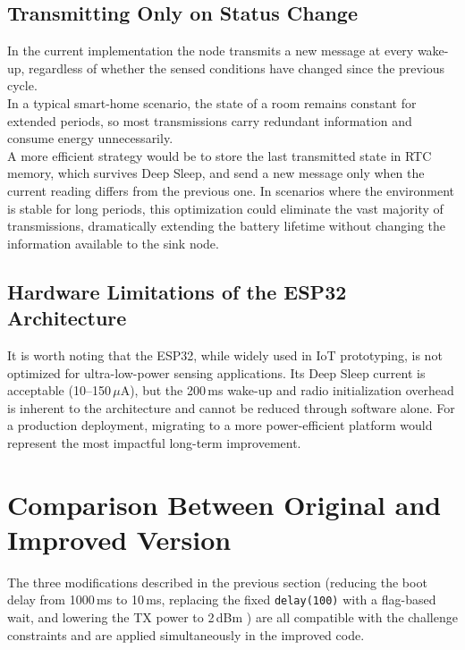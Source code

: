 \documentclass[a4paper,11pt]{article}
\begin{document}
\subsection{Transmitting Only on Status Change}

In the current implementation the node transmits a new message at every wake-up, regardless of whether the sensed conditions have changed since the previous cycle.\\

In a typical smart-home scenario, the state of a room remains constant for extended periods, so most transmissions carry redundant information and consume energy unnecessarily.\\

A more efficient strategy would be to store the last transmitted state in RTC memory, which survives Deep Sleep, and send a new message only when the current reading differs from the previous one. In scenarios where the environment is stable for long periods, this optimization could eliminate the vast majority of transmissions, dramatically extending the battery lifetime without changing the information available to the sink node.

\subsection{Hardware Limitations of the ESP32 Architecture}

It is worth noting that the ESP32, while widely used in IoT prototyping, is not
optimized for ultra-low-power sensing applications. Its Deep Sleep current is
acceptable (10--150\,$\mu$A), but the 200\,ms wake-up and radio initialization
overhead is inherent to the architecture and cannot be reduced through software alone.
For a production deployment, migrating to a more power-efficient platform would
represent the most impactful long-term improvement.

\section{Comparison Between Original and Improved Version}
 
The three modifications described in the previous section (reducing the boot delay from 1000\,ms to 10\,ms, replacing the fixed \texttt{delay(100)} with a flag-based wait, and lowering the TX power to 2\,dBm ) are all compatible with the challenge constraints and are applied simultaneously in the improved code. \\
\end{document}
